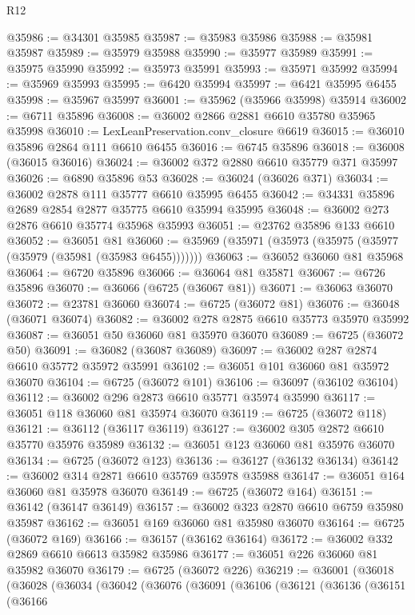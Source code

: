 \begin{lexlean}{R12}
\begin{coremodule}
@35986 := @34301 @35985
@35987 := @35983 @35986
@35988 := @35981 @35987
@35989 := @35979 @35988
@35990 := @35977 @35989
@35991 := @35975 @35990
@35992 := @35973 @35991
@35993 := @35971 @35992
@35994 := @35969 @35993
@35995 := @6420 @35994
@35997 := @6421 @35995 @6455
@35998 := @35967 @35997
@36001 := @35962 (@35966 @35998) @35914
@36002 := @6711 @35896
@36008 := @36002 @2866 @2881 @6610 @35780 @35965 @35998
@36010 := LexLeanPreservation.conv_closure @6619
@36015 := @36010 @35896 @2864 @111 @6610 @6455
@36016 := @6745 @35896
@36018 := @36008 (@36015 @36016)
@36024 := @36002 @372 @2880 @6610 @35779 @371 @35997
@36026 := @6890 @35896 @53
@36028 := @36024 (@36026 @371)
@36034 := @36002 @2878 @111 @35777 @6610 @35995 @6455
@36042 := @34331 @35896 @2689 @2854 @2877 @35775 @6610 @35994 @35995
@36048 := @36002 @273 @2876 @6610 @35774 @35968 @35993
@36051 := @23762 @35896 @133 @6610
@36052 := @36051 @81
@36060 := @35969 (@35971 (@35973 (@35975 (@35977 (@35979 (@35981 (@35983 @6455)))))))
@36063 := @36052 @36060 @81 @35968
@36064 := @6720 @35896
@36066 := @36064 @81 @35871
@36067 := @6726 @35896
@36070 := @36066 (@6725 (@36067 @81))
@36071 := @36063 @36070
@36072 := @23781 @36060
@36074 := @6725 (@36072 @81)
@36076 := @36048 (@36071 @36074)
@36082 := @36002 @278 @2875 @6610 @35773 @35970 @35992
@36087 := @36051 @50 @36060 @81 @35970 @36070
@36089 := @6725 (@36072 @50)
@36091 := @36082 (@36087 @36089)
@36097 := @36002 @287 @2874 @6610 @35772 @35972 @35991
@36102 := @36051 @101 @36060 @81 @35972 @36070
@36104 := @6725 (@36072 @101)
@36106 := @36097 (@36102 @36104)
@36112 := @36002 @296 @2873 @6610 @35771 @35974 @35990
@36117 := @36051 @118 @36060 @81 @35974 @36070
@36119 := @6725 (@36072 @118)
@36121 := @36112 (@36117 @36119)
@36127 := @36002 @305 @2872 @6610 @35770 @35976 @35989
@36132 := @36051 @123 @36060 @81 @35976 @36070
@36134 := @6725 (@36072 @123)
@36136 := @36127 (@36132 @36134)
@36142 := @36002 @314 @2871 @6610 @35769 @35978 @35988
@36147 := @36051 @164 @36060 @81 @35978 @36070
@36149 := @6725 (@36072 @164)
@36151 := @36142 (@36147 @36149)
@36157 := @36002 @323 @2870 @6610 @6759 @35980 @35987
@36162 := @36051 @169 @36060 @81 @35980 @36070
@36164 := @6725 (@36072 @169)
@36166 := @36157 (@36162 @36164)
@36172 := @36002 @332 @2869 @6610 @6613 @35982 @35986
@36177 := @36051 @226 @36060 @81 @35982 @36070
@36179 := @6725 (@36072 @226)
@36219 := @36001
    (@36018
      (@36028
        (@36034
          (@36042
            (@36076
              (@36091
                (@36106
                  (@36121
                    (@36136
                      (@36151
                        (@36166

\end{coremodule}
\end{lexlean}
